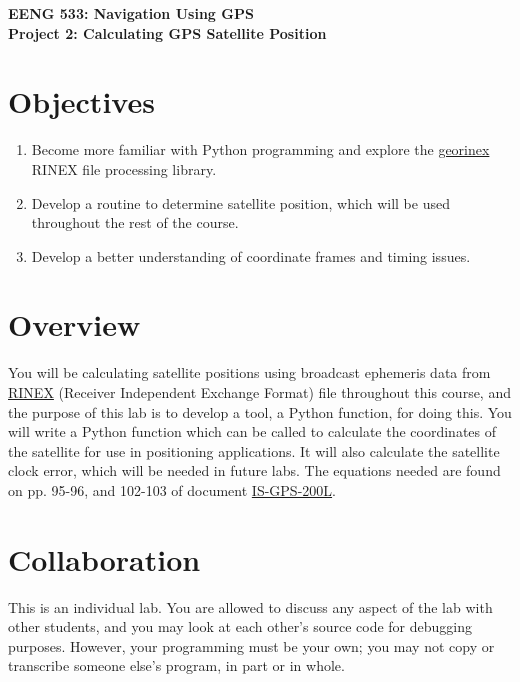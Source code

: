 \documentclass[12pt]{article}
\begin{document}
\begin{minipage}{0.9\textwidth}
   \raggedright
   \large \textbf{\textsf{{\color{gray}EENG 533: Navigation Using GPS} \\
      Project 2: Calculating GPS Satellite Position}}
\end{minipage}
\vspace{1cm}

\section*{\textsf{Objectives}}

\begin{enumerate}
   \item Become more familiar with Python programming and explore the 
            \href{https://pypi.org/project/georinex/}{georinex} RINEX file processing library.
   \item Develop a routine to determine satellite position, which will be used
      throughout the rest of the course.
   \item Develop a better understanding of coordinate frames and timing
      issues.
\end{enumerate}

\section*{\textsf{Overview}}

You will be calculating satellite positions using broadcast ephemeris data
from \href{https://en.wikipedia.org/wiki/RINEX}{RINEX} (Receiver Independent Exchange Format) 
file throughout this course, and the purpose of this lab is to develop a tool, a Python function, 
for doing this.  You will write a Python function which can be
called to calculate the coordinates of the satellite for use in positioning
applications.  It will also calculate the satellite clock error, which will be
needed in future labs.  The equations needed are found on pp. 95-96, and 102-103 of
document \href{https://www.gps.gov/technical/icwg/IS-GPS-200L.pdf}{IS-GPS-200L}.

\section*{\textsf{Collaboration}}

This is an individual lab.   You are allowed to discuss any aspect of the lab
with other students, and you may look at each other's source code for debugging
purposes.  However, your programming must be your own; you may not copy or
transcribe someone else's program, in part or in whole.
\end{document}
